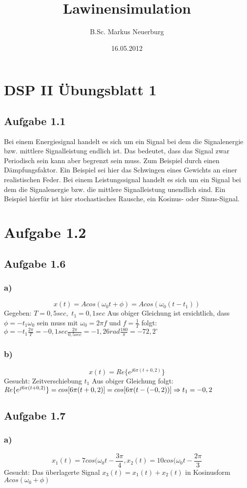 \documentclass[12pt]{scrreprt}
\title{Lawinensimulation}
\author{B.Sc. Markus Neuerburg}
\date{16.05.2012}
\begin{document}
\setlength{\topmargin}{0cm}
\parindent 0pt
\section*{DSP II Übungsblatt 1}
\subsection*{Aufgabe 1.1}
Bei einem Energiesignal handelt es sich um ein Signal bei dem die Signalenergie bzw. mittlere Signalleistung endlich ist. Das bedeutet, dass das Signal zwar Periodisch sein kann aber begrenzt sein muss. Zum Beispiel durch einen Dämpfungsfaktor. Ein Beispiel sei hier das Schwingen eines Gewichts an einer realistischen Feder.\newline
\newline
Bei einem Leistungssignal handelt es sich um ein Signal bei dem die Signalenergie bzw. die mittlere Signalleistung unendlich sind.
Ein Beispiel hierfür ist hier stochastisches Rausche, ein Kosinus- oder Sinus-Signal.\newline
\section*{Aufgabe 1.2}

\subsection*{Aufgabe 1.6}
\subsubsection*{a)}
\begin{equation}
	x(t)=A cos(\omega_0 t + \phi) = A cos(\omega_0(t-t_1))
\end{equation}
Gegeben:\newline
$T=0,5 sec,$\newline
$t_1=0,1 sec$\newline
Aus obiger Gleichung ist ersichtlich, dass $\phi=-t_1 \omega_0$ sein muss mit $\omega_0= 2 \pi f$ und $f=\frac{1}{T}$ folgt: $\phi=-t_1 \frac{2 \pi}{T} = -0,1sec \frac{2 \pi}{0,5sec} = -1,26 rad  \frac{180}{\pi} = -72,2^\circ$
\subsubsection*{b)}
\begin{equation}
	x(t)=Re \lbrace e^{j 6 \pi (t + 0,2)} \rbrace
\end{equation}
Gesucht:\newline
Zeitverschiebung $t_1$\newline
Aus obiger Gleichung folgt: $Re \lbrace e^{j 6 \pi (t + 0,2)} \rbrace = cos[6\pi(t + 0,2)] = cos[6\pi(t - (-0,2))] \newline \Rightarrow t_1 = -0,2$
\subsection*{Aufgabe 1.7}
\subsubsection*{a)}
\begin{equation}
	x_1(t)=7cos(\omega_0 t - \frac{3\pi}{4}, x_2(t)=10cos(\omega_0 t - \frac{2\pi}{3}
\end{equation}
Gesucht: \newline
Das überlagerte Signal $x_3(t) = x_1(t) + x_2(t)$ in Kosinusform $Acos(\omega_0 + \phi)$
\end{document}
